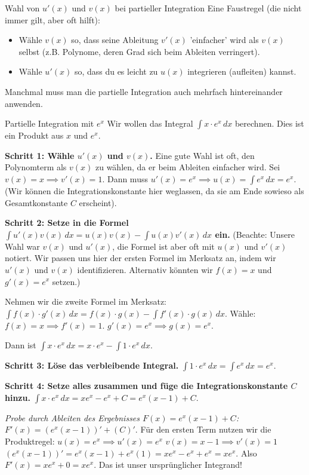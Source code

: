 \begin{tippumgebung}{Wahl von $u'(x)$ und $v(x)$ bei partieller Integration}
Eine Faustregel (die nicht immer gilt, aber oft hilft):
\begin{itemize}
    \item Wähle $v(x)$ so, dass seine Ableitung $v'(x)$ 'einfacher' wird als $v(x)$ selbst (z.B. Polynome, deren Grad sich beim Ableiten verringert).
    \item Wähle $u'(x)$ so, dass du es leicht zu $u(x)$ integrieren (aufleiten) kannst.
\end{itemize}
Manchmal muss man die partielle Integration auch mehrfach hintereinander anwenden.
\end{tippumgebung}

\begin{beispielumgebung}{Partielle Integration mit $e^x$}
Wir wollen das Integral $\int x \cdot e^x \,dx$ berechnen.
Dies ist ein Produkt aus $x$ und $e^x$.

\textbf{Schritt 1: Wähle $u'(x)$ und $v(x)$.}
Eine gute Wahl ist oft, den Polynomterm als $v(x)$ zu wählen, da er beim Ableiten einfacher wird.
Sei $v(x) = x \implies v'(x) = 1$.
Dann muss $u'(x) = e^x \implies u(x) = \int e^x \,dx = e^x$. (Wir können die Integrationskonstante hier weglassen, da sie am Ende sowieso als Gesamtkonstante $C$ erscheint).

\textbf{Schritt 2: Setze in die Formel $\int u'(x)v(x) \,dx = u(x)v(x) - \int u(x)v'(x) \,dx$ ein.}
(Beachte: Unsere Wahl war $v(x)$ und $u'(x)$, die Formel ist aber oft mit $u(x)$ und $v'(x)$ notiert. Wir passen uns hier der ersten Formel im Merksatz an, indem wir $u'(x)$ und $v(x)$ identifizieren. Alternativ könnten wir $f(x)=x$ und $g'(x)=e^x$ setzen.)

Nehmen wir die zweite Formel im Merksatz: $\int f(x) \cdot g'(x) \,dx = f(x) \cdot g(x) - \int f'(x) \cdot g(x) \,dx$.
Wähle:
$f(x) = x \implies f'(x) = 1$.
$g'(x) = e^x \implies g(x) = e^x$.

Dann ist $\int x \cdot e^x \,dx = x \cdot e^x - \int 1 \cdot e^x \,dx$.

\textbf{Schritt 3: Löse das verbleibende Integral.}
$\int 1 \cdot e^x \,dx = \int e^x \,dx = e^x$.

\textbf{Schritt 4: Setze alles zusammen und füge die Integrationskonstante $C$ hinzu.}
$\int x \cdot e^x \,dx = x e^x - e^x + C = e^x(x-1) + C$.

\textit{Probe durch Ableiten des Ergebnisses $F(x) = e^x(x-1) + C$:}
$F'(x) = (e^x(x-1))' + (C)'$. Für den ersten Term nutzen wir die Produktregel:
$u(x)=e^x \implies u'(x)=e^x$
$v(x)=x-1 \implies v'(x)=1$
$(e^x(x-1))' = e^x(x-1) + e^x(1) = xe^x - e^x + e^x = xe^x$.
Also $F'(x) = xe^x + 0 = xe^x$. Das ist unser ursprünglicher Integrand!
\end{beispielumgebung}

